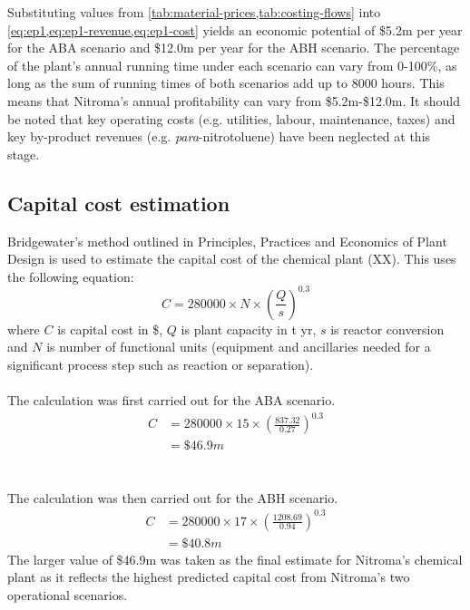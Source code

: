 Substituting values from \cref{tab:material-prices,tab:costing-flows} into \cref{eq:ep1,eq:ep1-revenue,eq:ep1-cost} yields an economic potential of \$5.2m per year for the ABA scenario and \$12.0m per year for the ABH scenario. The percentage of the plant's annual running time under each scenario can vary from 0-100\%, as long as the sum of running times of both scenarios add up to 8000 hours. This means that Nitroma's annual profitability can vary from \$5.2m-\$12.0m. It should be noted that key operating costs (e.g. utilities, labour, maintenance, taxes) and key by-product revenues (e.g. \textit{para}-nitrotoluene) have been neglected at this stage.

\subsection{Capital cost estimation}
Bridgewater's method outlined in Principles, Practices and Economics of Plant Design is used to estimate the capital cost of the chemical plant (XX). This uses the following equation:
\begin{equation}
    C= \num{280000} \times N \times \left(\frac{Q}{s}\right)^{0.3}
\end{equation}
where $C$ is capital cost in \$, $Q$ is  plant capacity in t yr, $s$ is reactor conversion and $N$ is number of functional units (equipment and ancillaries needed for a significant process step such as reaction or separation).
\\
\\
The calculation was first carried out for the ABA scenario.
\begin{align*}
C &= \num{280000} \times 15 \times \left(\frac{837.32}{0.27}\right)^{0.3}  \\
  &= \$46.9m 
\end{align*}
\\
\\
The calculation was then carried out for the ABH scenario.
\begin{align*}
C &= 280000 \times 17 \times \left(\frac{1208.69}{0.94}\right)^{0.3}  \\
  &=\$40.8m 
\end{align*}
The larger value of \$46.9m was taken as the final estimate for Nitroma's chemical plant as it reflects the highest predicted capital cost from Nitroma's two operational scenarios.